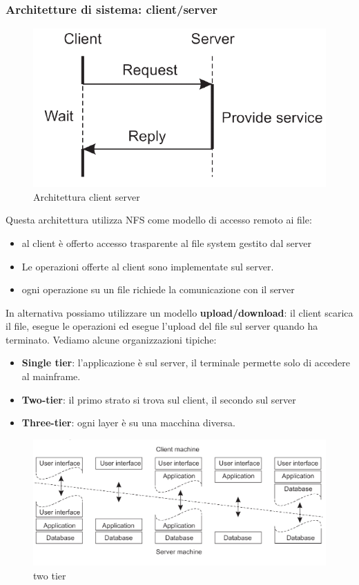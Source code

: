 \documentclass[12pt]{article}
\begin{document}
 	\subsubsection{Architetture di sistema: client/server }
 	 	
 		\begin{figure}[h!]
 			\centering
 			\includegraphics[scale=0.40]{img/clie.png}
 			\caption{Architettura client server}
 		\end{figure}
 		Questa architettura utilizza NFS come modello di accesso remoto ai file:
 		\begin{itemize}
 			\item al client è offerto accesso trasparente al file system gestito dal server
 			\item Le operazioni offerte al client sono implementate sul server.
 			\item ogni operazione su un file richiede la comunicazione con il server
 		\end{itemize}
 		In alternativa possiamo utilizzare un modello \textbf{upload/download}:
 		il client scarica il file, esegue le operazioni ed esegue l'upload del file sul server quando ha terminato. Vediamo alcune organizzazioni tipiche:
 		\begin{itemize}
 			\item \textbf{Single tier}: l'applicazione è sul server, il terminale permette solo di accedere al mainframe.
 			\item \textbf{Two-tier}: il primo strato si trova sul client, il secondo sul server 
 			\item \textbf{Three-tier}: ogni layer è su una macchina diversa.
 		\end{itemize}
 		\begin{figure}[h!]
 			\centering
 			\includegraphics[scale=0.40]{img/two.png}
 			\caption{two tier}
 		\end{figure}
\end{document}
